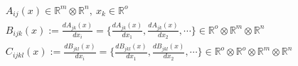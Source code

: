 \documentclass{amsart}
\begin{document}
\thispagestyle{empty}

\begin{align*}
  &A_{ij}(x)\in\mathbb{R}^m\otimes\mathbb{R}^n,~x_k\in\mathbb{R}^o\\
  &B_{ijk}(x) := \frac{dA_{jk}(x)}{dx_i} = \{\frac{dA_{jk}(x)}{dx_1}, \frac{dA_{jk}(x)}{dx_2}, \cdots\}\in\mathbb{R}^o\otimes\mathbb{R}^m\otimes\mathbb{R}^n\\
  &C_{ijkl}(x) := \frac{dB_{jkl}(x)}{dx_i} = \{\frac{dB_{jkl}(x)}{dx_1}, \frac{dB_{jkl}(x)}{dx_2}, \cdots\}\in\mathbb{R}^o\otimes\mathbb{R}^o\otimes\mathbb{R}^m\otimes\mathbb{R}^n\\
\end{align*}
\end{document}
